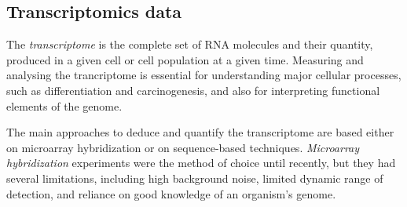 \subsection{Transcriptomics data} \label{rnaSeq-data-sect}
The \emph{transcriptome} is the complete set of RNA molecules and their quantity, produced in a given cell or cell population at a given time. Measuring and analysing the trancriptome is essential for understanding major cellular processes, such as differentiation and carcinogenesis, and also for interpreting functional elements of the genome. 

The main approaches to deduce and quantify the transcriptome are based either on microarray hybridization or on sequence-based techniques. \emph{Microarray hybridization} experiments \citep{Babu2004} were the method of choice until recently, but they had several limitations, including high background noise, limited dynamic range of detection, and reliance on good knowledge of an organism's genome. 

